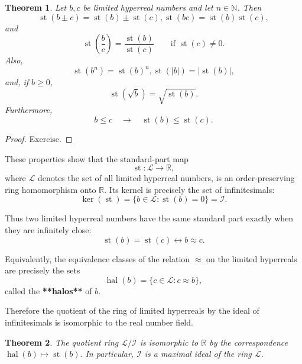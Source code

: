 \documentclass[10pt,a4paper]{book}
\newtheorem{theorem}{Theorem}[section]
\begin{document}
\begin{theorem}

    Let $b,c$ be limited hyperreal numbers and let $n\in\mathbb N$. Then $$
        \operatorname{st}(b\pm c)=\operatorname{st}(b)\pm\operatorname{st}(c),
        \operatorname{st}(bc)=\operatorname{st}(b)\operatorname{st}(c), $$ and $$
        \operatorname{st}\left(\frac
        bc\right)=\frac{\operatorname{st}(b)}{\operatorname{st}(c)} \qquad\text{if
        }\operatorname{st}(c)\neq0. $$ Also, $$
        \operatorname{st}(b^n)=\operatorname{st}(b)^n,
        \operatorname{st}(|b|)=|\operatorname{st}(b)|, $$ and, if $b\geq0$, $$
        \operatorname{st}(\sqrt b)=\sqrt{\operatorname{st}(b)}. $$ Furthermore, $$
        b\leq c\quad \to\quad\operatorname{st}(b)\leq\operatorname{st}(c). $$

\end{theorem}

\begin{proof}

    Exercise.

\end{proof}

These properties show that the standard-part map $$ \operatorname{st}:\mathcal
    L\to\mathbb R, $$ where $\mathcal L$ denotes the set of all limited hyperreal
numbers, is an order-preserving ring homomorphism onto $\mathbb R$. Its kernel
is precisely the set of infinitesimals: $$
    \ker(\operatorname{st})=\{b\in\mathcal L:\operatorname{st}(b)=0\}=\mathcal I.
$$

Thus two limited hyperreal numbers have the same standard part exactly when
they are infinitely close: $$
    \operatorname{st}(b)=\operatorname{st}(c)\leftrightarrow b\approx c. $$

Equivalently, the equivalence classes of the relation $\approx$ on the limited
hyperreals are precisely the sets $$ \operatorname{hal}(b)=\{c\in\mathcal
    L:c\approx b\}, $$ called the \textbf{**halos**} of $b$.

Therefore the quotient of the ring of limited hyperreals by the ideal of
infinitesimals is isomorphic to the real number field.

\begin{theorem}

    The quotient ring $ \mathcal L/\mathcal I $ is isomorphic to $\mathbb R$ by
    the correspondence $ \operatorname{hal}(b)\longmapsto\operatorname{st}(b). $
    In particular, $ \mathcal I $ is a maximal ideal of the ring $\mathcal L$.

\end{theorem}
\end{document}

